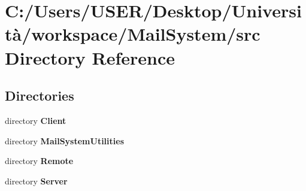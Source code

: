 \section{C\+:/\+Users/\+U\+S\+E\+R/\+Desktop/\+Università/workspace/\+Mail\+System/src Directory Reference}
\label{dir_5dfe4cec9b39046ecec4d28b2b36fdc2}
\subsection*{Directories}
\begin{DoxyCompactItemize}
\item 
directory \textbf{ Client}
\item 
directory \textbf{ Mail\+System\+Utilities}
\item 
directory \textbf{ Remote}
\item 
directory \textbf{ Server}
\end{DoxyCompactItemize}
